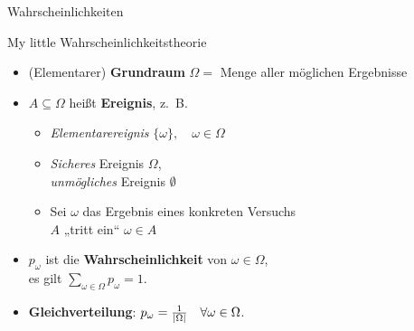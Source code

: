 

\def\haslogo{}



\date{26. Mai \thisyear}

\morescalingdelimiters


	
	
	\begin{frame}
		\titlepage
	\end{frame}
	
\begin{headframe}
	Wahrscheinlichkeiten
\end{headframe}
	

\begin{frame}{My little Wahrscheinlichkeitstheorie}
	\begin{itemize}
		\item (Elementarer) \textbf{Grundraum} $\Omega =$ Menge aller möglichen Ergebnisse
		\item $A \subseteq \Omega$ heißt \textbf{Ereignis}, z.~B.
		\begin{itemize}
			\item \textit{Elementarereignis} $\{\omega\}, \quad  \omega \in \Omega$
			\item \textit{Sicheres} Ereignis $\Omega$, \\ \textit{unmögliches} Ereignis $\emptyset$
			\item Sei $\omega$ das Ergebnis eines konkreten Versuchs \\ 
			\Impl $A$ „tritt ein“ \gdw $\omega \in A$
		\end{itemize}
		\item $p_\omega$ ist die \textbf{Wahrscheinlichkeit} von $\omega \in \Omega$, \\ es gilt $\sum\limits_{\omega \in \Omega} p_\omega = 1$.
		\item \textbf{Gleichverteilung}: $p_\omega = \frac{1}{\left| \Omega \right|} \quad \forall \omega \in \Omega$.	
	\end{itemize}
\end{frame}

